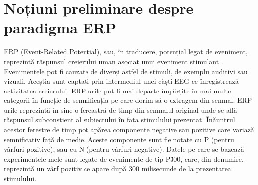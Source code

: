\section{Noțiuni preliminare despre paradigma ERP}

ERP (Event-Related Potential), sau, în traducere, potențial legat de eveniment, reprezintă răspunsul creierului uman asociat unui eveniment stimulant \cite{erp_introduction}. Evenimentele pot fi cauzate de diverși astfel de stimuli, de exemplu auditivi sau vizuali. Aceștia sunt captați prin intermediul unei căști EEG ce înregistrează activitatea creierului. ERP-urile pot fi mai departe împărțite în mai multe categorii în funcție de semnificația pe care dorim să o extragem din semnal. ERP-urile reprezintă în sine o fereastră de timp din semnalul original unde se află răspunsul subconștient al subiectului în fața stimulului prezentat. Înăuntrul acestor ferestre de timp pot apărea componente negative sau pozitive care variază semnificativ față de medie. Aceste componente sunt fie notate cu P (pentru vârfuri pozitive), sau cu N (pentru vârfuri negative). Datele pe care se bazează experimentele mele sunt legate de evenimente de tip P300, care, din denumire, reprezintă un vârf pozitiv ce apare după 300 milisecunde de la prezentarea stimulului.